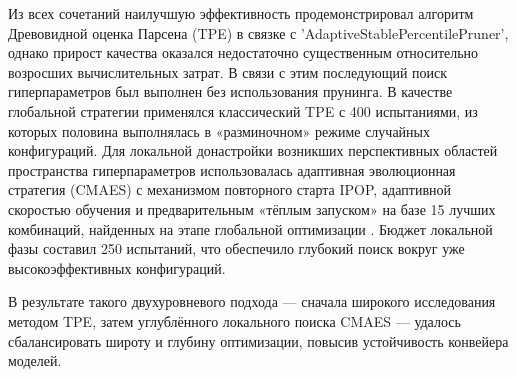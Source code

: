 Из всех сочетаний наилучшую эффективность продемонстрировал алгоритм Древовидной оценка Парсена (TPE)
\parencite{TPE2023watanabe, TPEandBO2011bergstra, HPOoverview2015shahriari} в связке с 'AdaptiveStablePercentilePruner',
однако прирост качества оказался недостаточно существенным относительно возросших вычислительных затрат.
В связи с этим последующий поиск гиперпараметров был выполнен без использования прунинга.
В качестве глобальной стратегии применялся классический TPE с 400 испытаниями, из которых половина
выполнялась в «разминочном» режиме случайных конфигураций. Для локальной донастройки возникших
перспективных областей пространства гиперпараметров использовалась адаптивная эволюционная стратегия
(CMAES) \parencite{restartCMAES2005auger, CMAES2024nomura} с механизмом повторного старта IPOP, адаптивной
скоростью обучения и предварительным «тёплым запуском» на базе 15 лучших комбинаций, найденных
на этапе глобальной оптимизации \parencite{CMAES2024nomura, lrCMAES2023nomura, restartCMAES2005auger, warmCMAES2021nomura}.
Бюджет локальной фазы составил 250 испытаний, что обеспечило глубокий поиск вокруг уже высокоэффективных конфигураций.

В результате такого двухуровневого подхода --- сначала широкого исследования методом TPE, затем углублённого
локального поиска CMAES --- удалось сбалансировать широту и глубину оптимизации, повысив устойчивость конвейера моделей.